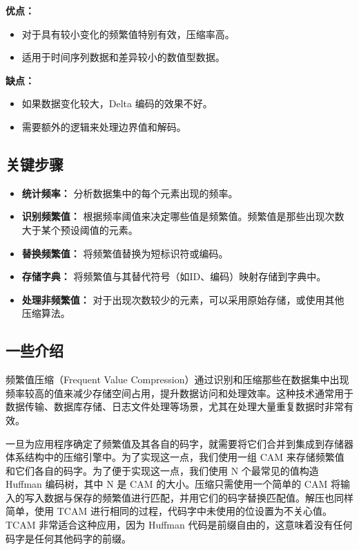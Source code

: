 \documentclass[12pt]{article}
\begin{document}
\textbf{优点：}
\begin{itemize}
  \item 对于具有较小变化的频繁值特别有效，压缩率高。
  \item 适用于时间序列数据和差异较小的数值型数据。
\end{itemize}

\textbf{缺点：}
\begin{itemize}
  \item 如果数据变化较大，Delta 编码的效果不好。
  \item 需要额外的逻辑来处理边界值和解码。
\end{itemize}

\subsection{关键步骤}
\begin{itemize}
  \item \textbf{统计频率：} 分析数据集中的每个元素出现的频率。
  \item \textbf{识别频繁值：} 根据频率阈值来决定哪些值是频繁值。频繁值是那些出现次数大于某个预设阈值的元素。
  \item \textbf{替换频繁值：} 将频繁值替换为短标识符或编码。
  \item \textbf{存储字典：} 将频繁值与其替代符号（如ID、编码）映射存储到字典中。
  \item \textbf{处理非频繁值：} 对于出现次数较少的元素，可以采用原始存储，或使用其他压缩算法。
\end{itemize}

\subsection{一些介绍}

频繁值压缩（Frequent Value Compression）通过识别和压缩那些在数据集中出现频率较高的值来减少存储空间占用，提升数据访问和处理效率。这种技术通常用于数据传输、数据库存储、日志文件处理等场景，尤其在处理大量重复数据时非常有效。

一旦为应用程序确定了频繁值及其各自的码字，就需要将它们合并到集成到存储器体系结构中的压缩引擎中。为了实现这一点，我们使用一组 CAM 来存储频繁值和它们各自的码字。为了便于实现这一点，我们使用 N 个最常见的值构造 Huffman 编码树，其中 N 是 CAM 的大小。压缩只需使用一个简单的 CAM 将输入的写入数据与保存的频繁值进行匹配，并用它们的码字替换匹配值。解压也同样简单，使用 TCAM 进行相同的过程，代码字中未使用的位设置为不关心值。TCAM 非常适合这种应用，因为 Huffman 代码是前缀自由的，这意味着没有任何码字是任何其他码字的前缀。
\end{document}
